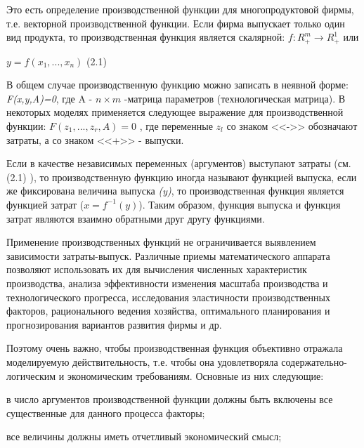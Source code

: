 \documentclass[12pt, 4paper]{book}
\begin{document}
{Это есть определение производственной функции для многопродуктовой фирмы, т.е. векторной производственной функции. Если фирма выпускает только один вид продукта, то производственная функция является скалярной: $f : R_{+}^{m} \rightarrow R_{+}^{1}$ или 
\par
\begin{center}
$y = f(x_1,...,x_n)$ (2.1)
\end{center}
\par

В общем случае производственную функцию можно записать в неявной форме: \textit{F(x,y,A)=0}, где A - $n \times m$ -матрица параметров (технологическая матрица). В некоторых моделях применяется следующее выражение для производственной функции: $F(z_1,...,z_r,A)=0$ , где переменные $z_l$ со знаком <<->> обозначают затраты, а со знаком <<+>> - выпуски. 
\par

Если в качестве независимых переменных (аргументов) выступают затраты (см. (2.1) ), то производственную функцию иногда называют функцией выпуска, если же фиксирована величина выпуска \textit{(y)}, то производственная функция является функцией затрат ($x = f^{-1}(y)$). Таким образом, функция выпуска и функция затрат являются взаимно обратными друг другу функциями. 
\par

Применение производственных функций не ограничивается выявлением зависимости затраты-выпуск. Различные приемы математического аппарата позволяют использовать их для вычисления численных характеристик производства, анализа эффективности изменения масштаба производства и технологического прогресса, исследования эластичности производственных факторов, рационального ведения хозяйства, оптимального планирования и прогнозирования вариантов развития фирмы и др. 
\par

Поэтому очень важно, чтобы производственная функция объективно отражала моделируемую действительность, т.е. чтобы она удовлетворяла содержательно-логическим и экономическим требованиям. Основные из них следующие: 
\par

в число аргументов производственной функции должны быть включены все существенные для данного процесса факторы; 
\par

все величины должны иметь отчетливый экономический смысл; 
\par

}
\end{document}

